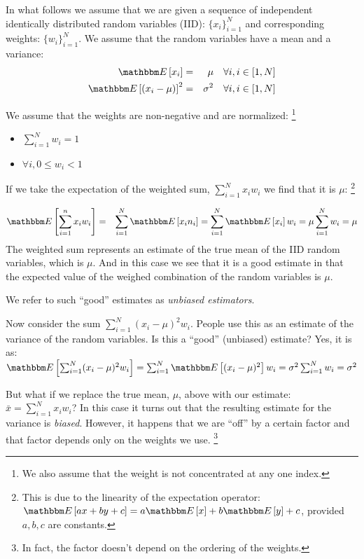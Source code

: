 \documentclass{article}
\newcommand{\E}[1] {\mathbbm E\left[#1\right]}
\begin{document}
In what follows we assume that we are given a sequence of independent identically distributed random variables (IID):
$\{x_i\}_{i=1}^N$ and corresponding weights: $\{w_i\}_{i=1}^N$.
We assume that the random variables have a mean and a variance:
\begin{eqnarray}
    \E{x_i} &=& \mu  \quad \forall i, i \in [1, N] \\
    \E{(x_i - \mu)}^2 &=& \sigma^2 \quad \forall i, i \in [1, N]  
\end{eqnarray}

We assume that the weights are non-negative and are normalized:%
\footnote{We also assume that the weight is not concentrated at any
one index.}
\begin{itemize}
    \item{$\sum_{i=1}^N w_i = 1$}
    \item{$\forall i, 0 \le w_i < 1$}
\end{itemize}

If we take the expectation of the weighted sum, $\sum_{i=1}^N x_i w_i$ we find that it is $\mu$:%
\footnote{This is due to the linearity of the expectation operator:
$\E{a x + b y + c} = a \E{x} + b \E{y} + c$, provided $a,b,c$ are constants.}

\begin{eqnarray}
    \E{\sum_{i=1}^n x_i w_i} &=& \sum_{i=1}^N \E{x_i n_i} = \sum_{i=1}^N \E{x_i} w_i = \mu \sum_{i=1}^N w_i = \mu 
\end{eqnarray}
The weighted sum represents an estimate of the true mean of the IID random variables, which is $\mu$.
And in this case we see that it is a good estimate in that the expected value of the weighed combination
of the random variables is $\mu$. 

We refer to such ``good'' estimates as {\em unbiased estimators\/}.

Now consider the sum $\sum_{i=1}^N (x_i - \mu)^2 w_i$.
People use this as an estimate of the variance of the random variables. Is this a ``good'' (unbiased) estimate?
Yes, it is as: $\E{\sum_{i=1}^N (x_i - \mu)^2 w_i} = \sum_{i=1}^N \E{(x_i- \mu)^2} w_i = \sigma^2 \sum_{i=1}^N w_i = \sigma^2$

But what if we replace the true mean, $\mu$, above with our estimate: ${\bar x} = \sum_{i=1}^N x_i w_i$?
In this case it turns out that the resulting estimate for the variance is {\em biased\/}.
However, it happens that we are ``off'' by a certain factor and that factor depends only on the weights 
we use.%
\footnote{In fact, the factor doesn't depend on the ordering of the weights.}
\end{document}
